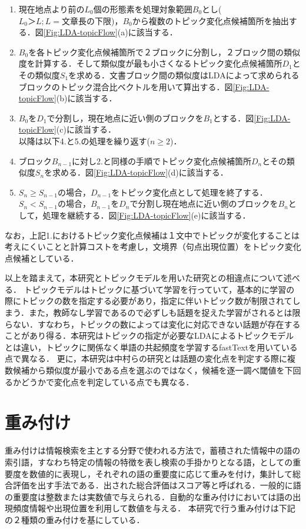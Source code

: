 \begin{enumerate}
  \item 現在地点より前の$L_0$個の形態素を処理対象範囲$B_0$とし($L_0＞L;L=文章長の下限$)，$B_0$から複数のトピック変化点候補箇所を抽出する．図\ref{Fig:LDA-topicFlow}(a)に該当する．
  \item $B_0$を各トピック変化点候補箇所で２ブロックに分割し，２ブロック間の類似度を計算する．そして類似度が最も小さくなるトピック変化点候補箇所$D_1$とその類似度$S_1$を求める．文書ブロック間の類似度はLDAによって求められるブロックのトピック混合比ベクトルを用いて算出する．図\ref{Fig:LDA-topicFlow}(b)に該当する．
  \item $B_0$を$D_1$で分割し，現在地点に近い側のブロックを$B_1$とする．図\ref{Fig:LDA-topicFlow}(c)に該当する．
  \\
  以降は以下4.と5.の処理を繰り返す($n\geq2$)．
  \item ブロック$B_{n-1}$に対し2.と同様の手順でトピック変化点候補箇所$D_n$とその類似度$S_n$を求める．図\ref{Fig:LDA-topicFlow}(d)に該当する．
  \item $S_n \geq S_{n-1}$の場合，$D_{n-1}$をトピック変化点として処理を終了する．$S_n <  S_{n-1}$の場合，$B_{n-1}$を$D_n$で分割し現在地点に近い側のブロックを$B_n$として，処理を継続する．図\ref{Fig:LDA-topicFlow}(e)に該当する．
\end{enumerate}
なお，上記1.におけるトピック変化点候補は１文中でトピックが変化することは考えにくいことと計算コストを考慮し，文境界（句点出現位置）をトピック変化点候補としている．

以上を踏まえて，本研究とトピックモデルを用いた研究との相違点について述べる．
トピックモデルはトピックに基づいて学習を行っていて，基本的に学習の際にトピックの数を指定する必要があり，指定に伴いトピック数が制限されてしまう．また，教師なし学習であるので必ずしも話題を捉えた学習がされるとは限らない．すなわち，トピックの数によっては変化に対応できない話題が存在することがあり得る．本研究はトピックの指定が必要なLDAによるトピックモデルとは違い，トピックに関係なく単語の共起頻度を学習するfastTextを用いている点で異なる．
更に，本研究は中村らの研究とは話題の変化点を判定する際に複数候補から類似度が最小である点を選ぶのではなく，候補を逐一調べ閾値を下回るかどうかで変化点を判定している点でも異なる．
\section{重み付け}
\label{rel:part:weight}
重み付けは情報検索を主とする分野で使われる方法で，蓄積された情報中の語の索引語，すなわち特定の情報の特徴を表し検索の手掛かりとなる語，としての重要度を数値的に表現し，それぞれの語の重要度に応じて重みを付け，集計して総合評価を出す手法である．出された総合評価はスコア等と呼ばれる．一般的に語の重要度は整数または実数値で与えられる．自動的な重み付けにおいては語の出現頻度情報や出現位置を利用して数値を与える．
本研究で行う重み付けは下記の２種類の重み付けを基にしている．
